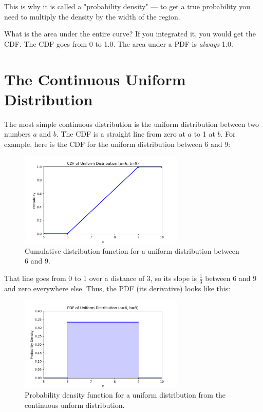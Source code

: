 This is why it is called a "probability density" --- to get a true probability you need to multiply the density by the width of the region.

What is the area under the entire curve?  If you integrated it, you would get the CDF. The CDF goes from 0 to 1.0.  The area under a PDF is \emph{always} 1.0.

\section{The Continuous Uniform Distribution}

The most simple continuous distribution is the uniform distribution between two numbers $a$ and $b$. The CDF is a straight line from zero at $a$ to 1 at $b$. For example,
here is the CDF for the uniform distribution between 6 and 9:
\begin{figure}[htbp]
    \centering
    \includegraphics[width=0.7\textwidth]{unif_cdf.png}
    \caption{Cumulative distribution function for a uniform distribution between 6 and 9.}
    \label{fig:example}
\end{figure}

That line goes from 0 to 1 over a distance of 3, so its slope is $\frac{1}{3}$ between 6 and  9 and zero everywhere else. Thus, the PDF (its derivative) looks like this:
\begin{figure}[htbp]
    \centering
    \includegraphics[width=0.7\textwidth]{unif_pdf.png}
    \caption{Probability density function for a uniform distribution from the continuous unform distribution.}
    \label{fig:example}
\end{figure}

